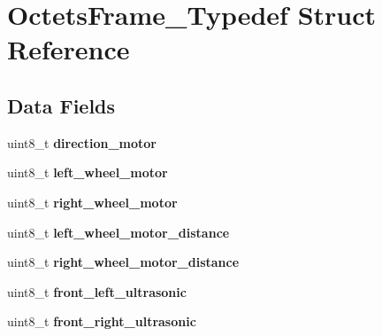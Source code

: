 \hypertarget{struct_octets_frame___typedef}{}\section{Octets\+Frame\+\_\+\+Typedef Struct Reference}
\label{struct_octets_frame___typedef}
\subsection*{Data Fields}
\begin{DoxyCompactItemize}
\item 
\mbox{\label{struct_octets_frame___typedef_ab22e09e343196c1788780558d9e5a0ae}} 
uint8\+\_\+t {\bfseries direction\+\_\+motor}
\item 
\mbox{\label{struct_octets_frame___typedef_a4c672398a89e5cf0164324a00183f922}} 
uint8\+\_\+t {\bfseries left\+\_\+wheel\+\_\+motor}
\item 
\mbox{\label{struct_octets_frame___typedef_a27591501debf6e6053f7c3e376e5aa49}} 
uint8\+\_\+t {\bfseries right\+\_\+wheel\+\_\+motor}
\item 
\mbox{\label{struct_octets_frame___typedef_ae15b87c890164bce27eb5f2607e64a25}} 
uint8\+\_\+t {\bfseries left\+\_\+wheel\+\_\+motor\+\_\+distance}
\item 
\mbox{\label{struct_octets_frame___typedef_ac68f226c7529335c37f27cd95aedff32}} 
uint8\+\_\+t {\bfseries right\+\_\+wheel\+\_\+motor\+\_\+distance}
\item 
\mbox{\label{struct_octets_frame___typedef_a0544c5e77443611e9c54c911f20e7504}} 
uint8\+\_\+t {\bfseries front\+\_\+left\+\_\+ultrasonic}
\item 
\mbox{\label{struct_octets_frame___typedef_a58a01cc5d9578f22926385389b670bf8}} 
uint8\+\_\+t {\bfseries front\+\_\+right\+\_\+ultrasonic}
\item 
\mbox{\label{struct_octets_frame___typedef_a6131a734576ec72a5975546ac9e6c004}} 

\end{DoxyCompactItemize}
